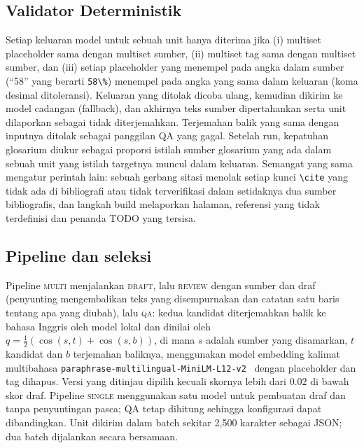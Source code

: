 \subsection{Validator Deterministik}
\label{sec:validators}
Setiap keluaran model untuk sebuah unit hanya diterima jika (i) multiset placeholder sama dengan multiset sumber, (ii) multiset tag sama dengan multiset sumber, dan (iii) setiap placeholder yang menempel pada angka dalam sumber (``58'' yang berarti \verb|58\%|) menempel pada angka yang sama dalam keluaran (koma desimal ditoleransi). Keluaran yang ditolak dicoba ulang, kemudian dikirim ke model cadangan (fallback), dan akhirnya teks sumber dipertahankan serta unit dilaporkan sebagai tidak diterjemahkan. Terjemahan balik yang sama dengan inputnya ditolak sebagai panggilan QA yang gagal. Setelah run, kepatuhan glosarium diukur sebagai proporsi istilah sumber glosarium yang ada dalam sebuah unit yang istilah targetnya muncul dalam keluaran. Semangat yang sama mengatur perintah lain: sebuah gerbang sitasi menolak setiap kunci \verb|\cite| yang tidak ada di bibliografi atau tidak terverifikasi dalam setidaknya dua sumber bibliografis, dan langkah build melaporkan halaman, referensi yang tidak terdefinisi dan penanda TODO yang tersisa.

\subsection{Pipeline dan seleksi}
\label{sec:pipelines}
Pipeline \textsc{multi} menjalankan \textsc{draft}, lalu \textsc{review} dengan sumber dan draf (penyunting mengembalikan teks yang disempurnakan dan catatan satu baris tentang apa yang diubah), lalu \textsc{qa}: kedua kandidat diterjemahkan balik ke bahasa Inggris oleh model lokal dan dinilai oleh $q=\tfrac12(\cos(s,t)+\cos(s,b))$, di mana $s$ adalah sumber yang disamarkan, $t$ kandidat dan $b$ terjemahan baliknya, menggunakan model embedding kalimat multibahasa \texttt{paraphrase-multilingual-MiniLM-L12-v2}~\cite{reimers2020multilingual} dengan placeholder dan tag dihapus. Versi yang ditinjau dipilih kecuali skornya lebih dari $0.02$ di bawah skor draf. Pipeline \textsc{single} menggunakan satu model untuk pembuatan draf dan tanpa penyuntingan pasca; QA tetap dihitung sehingga konfigurasi dapat dibandingkan. Unit dikirim dalam batch sekitar 2{,}500 karakter sebagai JSON; dua batch dijalankan secara bersamaan.

